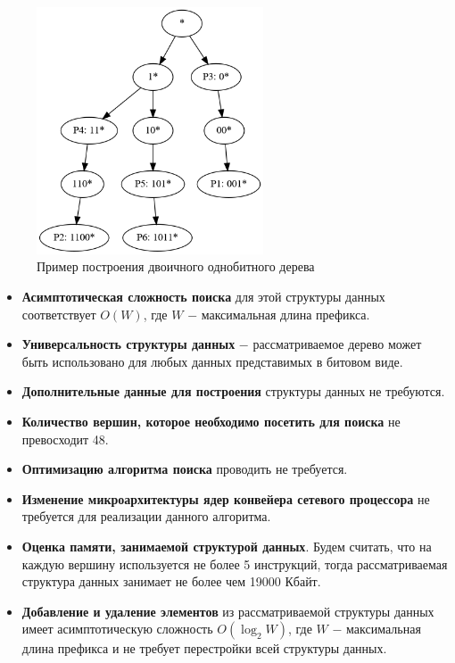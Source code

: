 \documentclass[a4peper, 12pt, titlepage, finall]{report}
\begin{document}
            \begin{figure}[h]      
                \centering 
                \includegraphics[width=0.6\textwidth]{binary.png}
                \caption{Пример построения двоичного однобитного дерева}\label{fig:mesh1}
            \end{figure}
            
            \begin{itemize}
                \item\textbf{Асимптотическая сложность поиска} для этой структуры данных соответствует {\ttfamily $O(W)$},
                где {\ttfamily $W$} $-$ максимальная длина префикса.
                \item\textbf{Универсальность структуры данных} $-$ рассматриваемое дерево может быть использовано для любых данных представимых в битовом виде.
                \item\textbf{Дополнительные данные для построения} структуры данных не требуются.
                \item\textbf{Количество вершин, которое необходимо посетить для поиска} не превосходит 48.
                \item\textbf{Оптимизацию алгоритма поиска} проводить не требуется.
                \item\textbf{Изменение микроархитектуры ядер конвейера сетевого процессора} не требуется для реализации данного алгоритма.
                \item\textbf{Оценка памяти, занимаемой структурой данных}. Будем считать, что на каждую вершину используется не более 5 инструкций,
                тогда рассматриваемая структура данных занимает не более чем 19000 Кбайт.
                \item\textbf{Добавление и удаление элементов} из рассматриваемой структуры данных имеет асимптотическую сложность 
            {\ttfamily $O(\log_2{W})$}, где {\ttfamily $W$} $-$ максимальная длина префикса и не требует перестройки всей структуры данных.\\
            \end{itemize}
\end{document}
